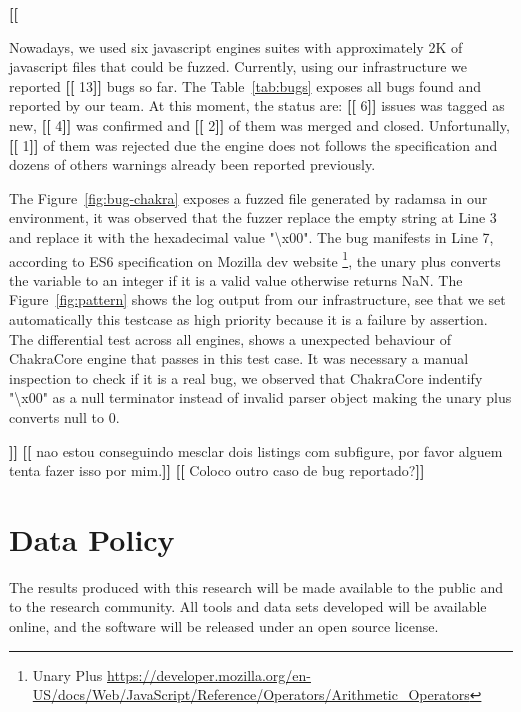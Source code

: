\documentclass[11pt]{article}
\newcommand{\Fix}[1]{\textbf{[[}{\color{red} #1}\textbf{]]}}
\newcommand{\Igor}[1]{\textbf{[[}{\color{darkaquamarine} #1}\textbf{]]}}
\begin{document}
\Igor{
  Nowadays, we used six javascript engines suites with approximately 2K of javascript files 
  that could be fuzzed. Currently, using our infrastructure we reported \Fix{13}
  bugs so far. The Table~\ref{tab:bugs} exposes all bugs found and reported by our team.
  At this moment, the status are: \Fix{6} issues was tagged as new, \Fix{4} was confirmed
  and \Fix{2} of them was merged and closed. Unfortunally, \Fix{1} of them was rejected
  due the engine does not follows the specification and dozens of others warnings already been
  reported previously.

  The Figure~\ref{fig:bug-chakra} exposes a fuzzed file generated by radamsa in our environment, it was observed
  that the fuzzer replace the empty string at Line 3 and replace it with the hexadecimal value "\textbackslash x00".
  The bug manifests in Line 7, according to ES6 specification on Mozilla dev website
  \footnote{Unary Plus \url{https://developer.mozilla.org/en-US/docs/Web/JavaScript/Reference/Operators/Arithmetic_Operators}},
  the unary plus converts the variable to an integer if it is a valid value
  otherwise returns NaN. The Figure~\ref{fig:pattern} shows the log output from our infrastructure,
  see that we set automatically this testcase as high priority because it is a failure by assertion.
  The differential test across all engines, shows a unexpected behaviour of ChakraCore engine that passes in this test case.
  It was necessary a manual inspection to check if it is a real bug, we observed that 
  ChakraCore indentify "\textbackslash x00" as a null terminator instead of invalid parser object making
  the unary plus converts null to 0.
}
\Fix{nao estou conseguindo mesclar dois listings com subfigure, por favor alguem tenta fazer isso por mim.}
\Igor{Coloco outro caso de bug reportado?}




\section{Data Policy}

The results produced with this research will be made available to the
public and to the research community.  All tools and data sets
developed will be available online, and the software will be released
under an open source license.


\footnotesize


\end{document}
